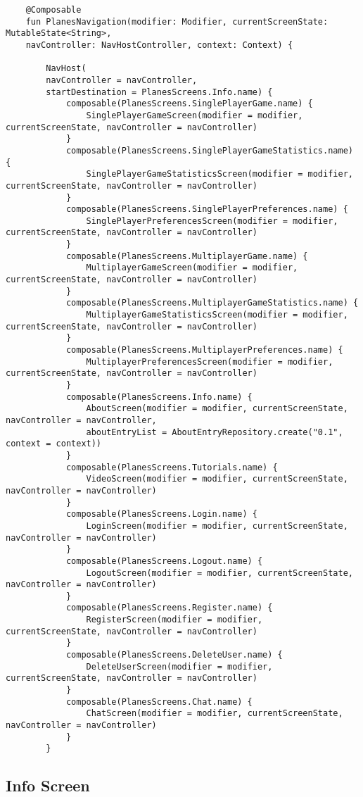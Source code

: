 \begin{lstlisting}
	@Composable
	fun PlanesNavigation(modifier: Modifier, currentScreenState: MutableState<String>,
	navController: NavHostController, context: Context) {
		
		NavHost(
		navController = navController,
		startDestination = PlanesScreens.Info.name) {
			composable(PlanesScreens.SinglePlayerGame.name) {
				SinglePlayerGameScreen(modifier = modifier, currentScreenState, navController = navController)
			}
			composable(PlanesScreens.SinglePlayerGameStatistics.name) {
				SinglePlayerGameStatisticsScreen(modifier = modifier, currentScreenState, navController = navController)
			}
			composable(PlanesScreens.SinglePlayerPreferences.name) {
				SinglePlayerPreferencesScreen(modifier = modifier, currentScreenState, navController = navController)
			}
			composable(PlanesScreens.MultiplayerGame.name) {
				MultiplayerGameScreen(modifier = modifier, currentScreenState, navController = navController)
			}
			composable(PlanesScreens.MultiplayerGameStatistics.name) {
				MultiplayerGameStatisticsScreen(modifier = modifier, currentScreenState, navController = navController)
			}
			composable(PlanesScreens.MultiplayerPreferences.name) {
				MultiplayerPreferencesScreen(modifier = modifier, currentScreenState, navController = navController)
			}
			composable(PlanesScreens.Info.name) {
				AboutScreen(modifier = modifier, currentScreenState, navController = navController,
				aboutEntryList = AboutEntryRepository.create("0.1", context = context))
			}
			composable(PlanesScreens.Tutorials.name) {
				VideoScreen(modifier = modifier, currentScreenState, navController = navController)
			}
			composable(PlanesScreens.Login.name) {
				LoginScreen(modifier = modifier, currentScreenState, navController = navController)
			}
			composable(PlanesScreens.Logout.name) {
				LogoutScreen(modifier = modifier, currentScreenState, navController = navController)
			}
			composable(PlanesScreens.Register.name) {
				RegisterScreen(modifier = modifier, currentScreenState, navController = navController)
			}
			composable(PlanesScreens.DeleteUser.name) {
				DeleteUserScreen(modifier = modifier, currentScreenState, navController = navController)
			}
			composable(PlanesScreens.Chat.name) {
				ChatScreen(modifier = modifier, currentScreenState, navController = navController)
			}
		}
\end{lstlisting}

\subsection{Info Screen}


